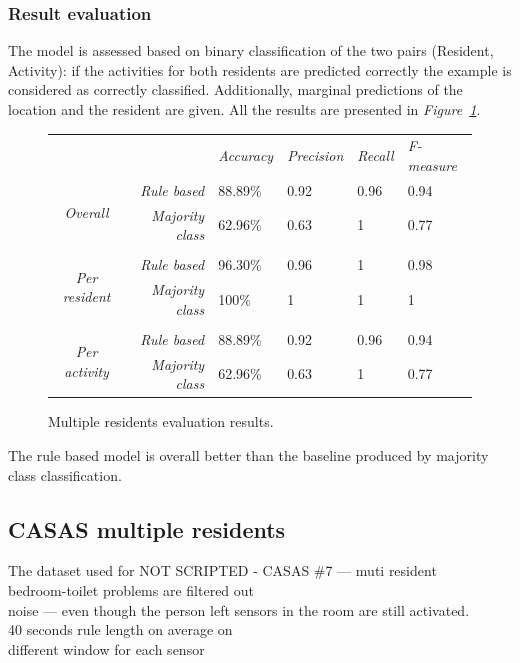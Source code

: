 \documentclass[10pt, a4paper, pdflatex, leqno, twoside, openright]{report}
\begin{document}
      \subsubsection{Result evaluation}
The model is assessed based on binary classification of the two pairs (Resident, Activity): if the activities for both residents are predicted correctly the example is considered as correctly classified. Additionally, marginal predictions of the location and the resident are given. All the results are presented in \emph{Figure~\ref{tab:mulResStats}}.\\

\begin{figure}[htb]
  \centering
  \begin{tabular}{ c r | l l l l }
 & & \emph{Accuracy} & \emph{Precision} & \emph{Recall} & \emph{F-measure}\\
\cline{2-6}
\multirow{2}{*}{\emph{Overall}}
 & \emph{Rule based} & 88.89\% & 0.92 & 0.96 & 0.94 \\
 & \emph{Majority class} & 62.96\% & 0.63 & 1 & 0.77\\
\cline{2-6}\\
\cline{2-6}
 \multirow{2}{*}{\emph{Per resident}}
 & \emph{Rule based} & 96.30\% & 0.96 & 1 & 0.98\\
 & \emph{Majority class} & 100\% & 1 & 1 & 1\\
\cline{2-6}\\
\cline{2-6}
 \multirow{2}{*}{\emph{Per activity}}
 & \emph{Rule based} & 88.89\% & 0.92 & 0.96 & 0.94\\
 & \emph{Majority class} & 62.96\% & 0.63 & 1 & 0.77\\
  \end{tabular}
  \caption{Multiple residents evaluation results.\label{tab:mulResStats}}
\end{figure}

The rule based model is overall better than the baseline produced by majority class classification.

    \subsection{CASAS multiple residents}
The dataset used for  NOT SCRIPTED - CASAS \#7 --- muti resident\\
bedroom-toilet problems are filtered out\\
noise --- even though the person left sensors in the room are still activated.\\
40 seconds rule length on average on\\
different window for each sensor\\
\end{document}
